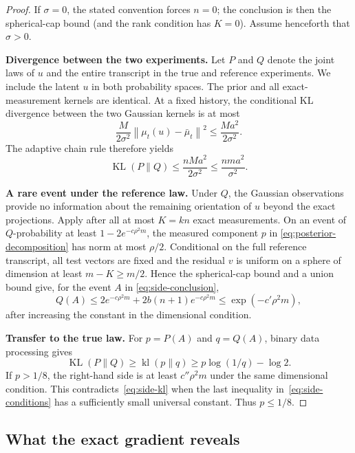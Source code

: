 \documentclass[11pt]{article}
\newcommand{\norm}[1]{\left\lVert #1\right\rVert}
\newcommand{\KL}{\operatorname{KL}}
\theoremstyle{definition}
\theoremstyle{remark}
\begin{document}
\begin{proof}
If $\sigma=0$, the stated convention forces $n=0$; the conclusion is then the
spherical-cap bound (and the rank condition has $K=0$).  Assume henceforth
that $\sigma>0$.

\noindent\textbf{Divergence between the two experiments.}
Let $P$ and $Q$ denote the joint laws of $u$ and the entire transcript in the
true and reference experiments.  We include the latent $u$ in both probability
spaces.  The prior and all exact-measurement kernels are identical.  At a fixed
history, the conditional KL divergence between the two Gaussian kernels is at
most
\[
 \frac{M}{2\sigma^2}\norm{\mu_t(u)-\bar\mu_t}^2
 \le \frac{Ma^2}{2\sigma^2}.
\]
The adaptive chain rule therefore yields
\begin{equation}\label{eq:side-kl}
 \KL(P\|Q)\le\frac{nMa^2}{2\sigma^2}
 \le\frac{nma^2}{\sigma^2}.
\end{equation}

\noindent\textbf{A rare event under the reference law.}
Under $Q$, the Gaussian observations provide no information about the remaining
orientation of $u$ beyond the exact projections.  Apply  after all
at most $K=kn$ exact measurements.  On an event of $Q$-probability at least
$1-2e^{-c\rho^2m}$, the measured component $p$ in
\eqref{eq:posterior-decomposition} has norm at most $\rho/2$.  Conditional on
the full reference transcript, all test vectors are fixed and the residual
$v$ is uniform on a sphere of dimension at least $m-K\ge m/2$.  Hence the
spherical-cap bound and a union bound give, for the event $A$ in
\eqref{eq:side-conclusion},
\begin{equation}\label{eq:reference-small-event}
 Q(A)\le 2e^{-c\rho^2m}+2b(n+1)e^{-c\rho^2m}
 \le \exp(-c'\rho^2m),
\end{equation}
after increasing the constant in the dimensional condition.

\noindent\textbf{Transfer to the true law.}
For $p=P(A)$ and $q=Q(A)$, binary data processing gives
\[
 \KL(P\|Q)\ge \operatorname{kl}(p\|q)
 \ge p\log(1/q)-\log2.
\]
If $p>1/8$, the right-hand side is at least $c''\rho^2m$ under the same
dimensional condition.  This contradicts~\eqref{eq:side-kl} when the last
inequality in~\eqref{eq:side-conditions} has a sufficiently small universal
constant.  Thus $p\le1/8$.
\end{proof}

\subsection{What the exact gradient reveals}
\end{document}
